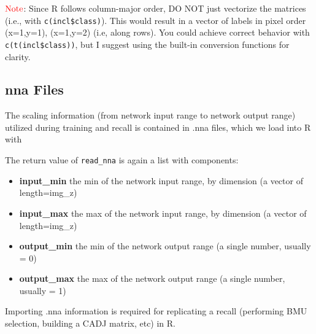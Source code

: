 \documentclass[]{article}
\newenvironment{Shaded}{\begin{snugshade}}{\end{snugshade}}
\newcommand{\CommentTok}[1]{\textcolor[rgb]{0.56,0.35,0.01}{\textit{#1}}}
\newcommand{\DataTypeTok}[1]{\textcolor[rgb]{0.13,0.29,0.53}{#1}}
\newcommand{\KeywordTok}[1]{\textcolor[rgb]{0.13,0.29,0.53}{\textbf{#1}}}
\newcommand{\NormalTok}[1]{#1}
\newcommand{\OperatorTok}[1]{\textcolor[rgb]{0.81,0.36,0.00}{\textbf{#1}}}
\newcommand{\StringTok}[1]{\textcolor[rgb]{0.31,0.60,0.02}{#1}}
\providecommand{\tightlist}{%
  \setlength{\itemsep}{0pt}\setlength{\parskip}{0pt}}
\begin{document}
\(\color{red}{\text{Note}}\): Since R follows column-major order, DO NOT just vectorize the matrices (i.e., with \texttt{c(incl\$class)}). This would result in a vector of labels in pixel order (x=1,y=1), (x=1,y=2) (i.e, along rows). You could achieve correct behavior with \texttt{c(t(incl\$class))}, but I suggest using the built-in conversion functions for clarity.

\hypertarget{nna-files}{%
\subsection{nna Files}\label{nna-files}}

The scaling information (from network input range to network output range) utilized during training and recall is contained in .nna files, which we load into R with

\begin{Shaded}
\end{Shaded}

The return value of \texttt{read\_nna} is again a list with components:

\begin{itemize}
\tightlist
\item
  \textbf{input\_min} the min of the network input range, by dimension (a vector of length=img\_z)
\item
  \textbf{input\_max} the max of the network input range, by dimension (a vector of length=img\_z)
\item
  \textbf{output\_min} the min of the network output range (a single number, usually = 0)
\item
  \textbf{output\_max} the max of the network output range (a single number, usually = 1)
\end{itemize}

Importing .nna information is required for replicating a recall (performing BMU selection, building a CADJ matrix, etc) in R.
\end{document}

